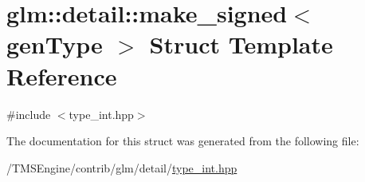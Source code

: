 \hypertarget{structglm_1_1detail_1_1make__signed}{}\section{glm\+:\+:detail\+:\+:make\+\_\+signed$<$ gen\+Type $>$ Struct Template Reference}
\label{structglm_1_1detail_1_1make__signed}


{\ttfamily \#include $<$type\+\_\+int.\+hpp$>$}



The documentation for this struct was generated from the following file\+:\begin{DoxyCompactItemize}
\item 
/\+T\+M\+S\+Engine/contrib/glm/detail/\hyperlink{type__int_8hpp}{type\+\_\+int.\+hpp}\end{DoxyCompactItemize}
